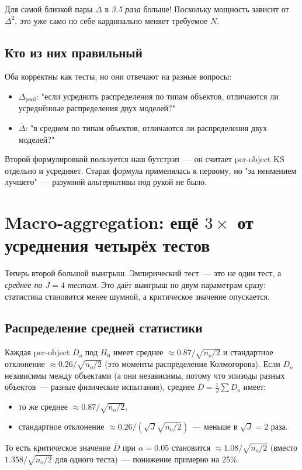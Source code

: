 \documentclass[11pt]{article}
\begin{document}
Для самой близкой пары $\bar\Delta$ в \emph{3.5 раза} больше! Поскольку мощность зависит от $\Delta^2$, это уже само по себе кардинально меняет требуемое $N$.

\subsection{Кто из них правильный}

Оба корректны как тесты, но они отвечают на разные вопросы:
\begin{itemize}[leftmargin=2em, itemsep=1pt]
\item $\Delta_\text{pool}$: "если усреднить распределения по типам объектов, отличаются ли усреднённые распределения двух моделей?"
\item $\bar\Delta$: "в среднем по типам объектов, отличаются ли распределения двух моделей?"
\end{itemize}
Второй формулировкой пользуется наш бутстрэп~--- он считает per-object KS отдельно и усредняет. Старая формула применялась к первому, но "за неимением лучшего"~--- разумной альтернативы под рукой не было.

\section{Macro-aggregation: ещё $3\times$ от усреднения четырёх тестов}

Теперь второй большой выигрыш. Эмпирический тест~--- это не один тест, а \emph{среднее по $J = 4$ тестам}. Это даёт выигрыш по двум параметрам сразу: статистика становится менее шумной, а критическое значение опускается.

\subsection{Распределение средней статистики}

Каждая per-object $D_o$ под $H_0$ имеет среднее $\approx 0.87/\sqrt{n_o/2}$ и стандартное отклонение $\approx 0.26/\sqrt{n_o/2}$ (это моменты распределения Колмогорова). Если $D_o$ независимы между объектами (а они независимы, потому что эпизоды разных объектов~--- разные физические испытания), среднее $\bar D = \frac{1}{J}\sum D_o$ имеет:
\begin{itemize}[leftmargin=2em, itemsep=1pt]
\item то же среднее $\approx 0.87/\sqrt{n_o/2}$,
\item стандартное отклонение $\approx 0.26/(\sqrt{J}\sqrt{n_o/2})$~--- меньше в $\sqrt{J} = 2$ раза.
\end{itemize}
То есть критическое значение $\bar D$ при $\alpha = 0.05$ становится $\approx 1.08/\sqrt{n_o/2}$ (вместо $1.358/\sqrt{n_o/2}$ для одного теста)~--- понижение примерно на 25\%.
\end{document}
